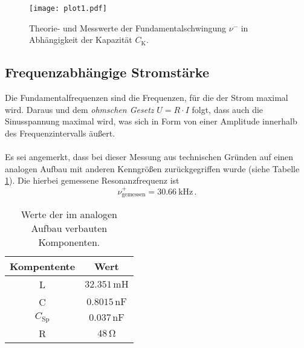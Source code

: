 \begin{figure}[H]
    \centering
    \texttt{[image: plot1.pdf]}
    \caption{Theorie- und Messwerte der Fundamentalschwingung $\nu^-$ in Abhängigkeit
    der Kapazität ${C_\text{K}}$.}
    \label{fig:plot1}
\end{figure}

\subsection{Frequenzabhängige Stromstärke}

Die Fundamentalfrequenzen sind die Frequenzen, für die der Strom maximal wird. 
Daraus und dem \textit{ohmschen Gesetz} $U = R \cdot I$ folgt, dass auch die Sinusspannung maximal wird,
was sich in Form von einer Amplitude innerhalb des Frequenzintervalls äußert.\\
\\
Es sei angemerkt, dass bei dieser Messung aus technischen Gründen auf einen analogen Aufbau mit anderen Kenngrößen
zurückgegriffen wurde (siehe Tabelle \ref{tab:komponenten_schaltung2}). Die hierbei gemessene Resonanzfrequenz ist 
\begin{equation*}
    \nu^+_{\text{gemessen}} = \qty{30.66}{\kilo\hertz} \, .
\end{equation*}

\begin{table}
    \centering
    \caption{Werte der im analogen Aufbau verbauten Komponenten.}
    \label{tab:komponenten_schaltung2}
    \begin{tabular}{c c}
        \toprule
        Kompentente &  Wert \\
        \midrule
        L               & $32.351 \, \unit{\milli\henry}$   \\
        C               & $0.8015 \, \unit{\nano\farad}$    \\
        $C_{\text{Sp}}$ & $ 0.037 \, \unit{\nano\farad}$    \\
        R               & $ 48 \, \unit{\ohm}$              \\
        \bottomrule
    \end{tabular}
\end{table}

